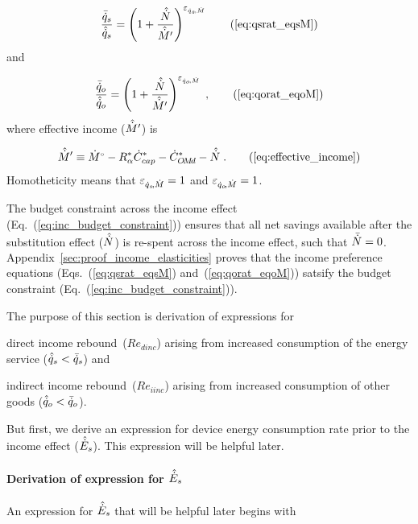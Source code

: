 \begin{equation}
  \incprefseqn \tag{\ref{eq:qsrat_eqsM}}
\end{equation}
%
and

\begin{equation}
  \incprefoeqn \; , \tag{\ref{eq:qorat_eqoM}}
\end{equation}
%
where effective income ($\hat{\dot{M}}^\prime$) is

\begin{equation}
  \effinceqn{} \; . \tag{\ref{eq:effective_income}}
\end{equation}
%
Homotheticity means that $\varepsilon_{\dot{q}_s\!,\dot{M}} = 1$ and $\varepsilon_{\dot{q}_o\!,\dot{M}} = 1$.

The budget constraint across the income effect (Eq.~(\ref{eq:inc_budget_constraint})) 
ensures that all net savings available after the substitution effect ($\hat{\dot{N}}$) 
is re-spent across the income effect, 
such that $\bar{\dot{N}} = 0$.
Appendix~\ref{sec:proof_income_elasticities} proves that
the income preference equations (Eqs.~(\ref{eq:qsrat_eqsM}) and~(\ref{eq:qorat_eqoM})) 
satsify the budget constraint (Eq.~(\ref{eq:inc_budget_constraint})).

The purpose of this section is derivation of expressions for 
%
\begin{enumerate*}[label={(\roman*)}]
	
  \item direct income rebound~($Re_{dinc}$) 
        arising from increased consumption of the energy service 
        ($\hat{\dot{q}}_s < \bar{\dot{q}}_s$) and
  
  \item indirect income rebound~($Re_{iinc}$) 
        arising from increased consumption of other goods 
        ($\hat{\dot{q}}_o < \bar{\dot{q}}_o$).
    
\end{enumerate*}

But first, we derive an expression 
for device energy consumption rate prior to the income effect 
($\hat{\dot{E}}_s$).
This expression will be helpful later.

\paragraph{Derivation of expression for $\hat{\dot{E}}_s$}
\label{sec:E_dot_s_hat_expression}

An expression for $\hat{\dot{E}}_s$ that will be helpful later
begins with

